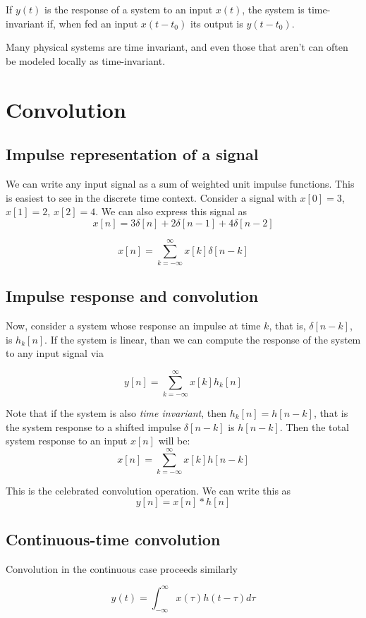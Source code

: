 If $y(t)$ is the response of a system to an input $x(t)$, the system
is time-invariant if, when fed an input $x(t-t_0)$ its output is $y(t
- t_0)$.
 
Many physical systems are time invariant, and even those that aren't
can often be modeled locally as time-invariant. 



\section{Convolution}


\subsection{Impulse representation of a signal}
We can write any input signal as a sum of weighted unit impulse
functions. This is easiest to see in the discrete time context. 
Consider a signal with $x[0]=3$, $x[1]=2$, $x[2] = 4$. We can also 
express this signal as 
\[
x[n] = 3\delta[n] + 2\delta[n-1] + 4\delta[n-2]
\]  

\[
x[n] = \sum_{k=-\infty}^\infty x[k]\delta[n-k]
\]

\subsection{Impulse response and convolution}
Now, consider a system whose response an impulse at time $k$, 
that is, $\delta[n-k]$, is $h_k[n]$. If the system is linear,
than we can compute the response of the system to any input signal
via

\[
y[n] = \sum_{k=-\infty}^{\infty} x[k] h_k[n]
\]

Note that if the system is also \textit{time invariant}, then
$h_k[n] = h[n -k]$, that is the system response to a shifted
impulse $\delta[n-k]$ is $h[n-k]$. Then the total system
response to an input $x[n]$ will be: 
\[
x[n] = \sum_{k=-\infty}^\infty x[k] h[n-k]
\]

This is the celebrated convolution operation. We can 
write this as
\[
y[n] = x[n] * h[n]
\]


\subsection{Continuous-time convolution}

Convolution in the continuous case proceeds similarly

\[
y(t) = \int_{-\infty}^{\infty} x(\tau) h(t - \tau) d\tau
\]


